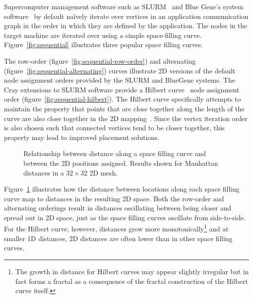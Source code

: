 				Supercomputer management software such as SLURM~\cite{yoo03} and Blue
				Gene's system software~\cite{gilge14} by default na\"ively iterate over
				vertices in an application communication graph in the order in which
				they are defined by the application. The nodes in the target machine
				are iterated over using a simple space-filling curve.
				Figure~\ref{fig:sequential} illustrates three popular space filling
				curves.
				
				The row-order (figure~\ref{fig:sequential-row-order}) and alternating
				(figure~\ref{fig:sequential-alternating}) curves illustrate 2D versions
				of the default node assignment orders provided by the SLURM and
				BlueGene systems.  The Cray extensions to SLURM software provide a
				Hilbert curve~\cite{hilbert91} node assignment order
				(figure~\ref{fig:sequential-hilbert}). The Hilbert curve specifically
				attempts to maintain the property that points that are close together
				along the length of the curve are also close together in the 2D
				mapping~\cite{moon01, zumbusch99}. Since the vertex iteration order is
				also chosen such that connected vertices tend to be closer together,
				this property may lead to improved placement solutions.
				
				\begin{figure}
					\center
					
					\caption[Relationship between space filling curve offset and 2D distance.]%
					{Relationship between distance along a space filling curve
					and between the 2D positions assigned. Results shown for
					Manhattan distances in a $32\times32$ 2D mesh.}
					\label{fig:space_filling_curves_comparison}
				\end{figure}
				
				Figure~\ref{fig:space_filling_curves_comparison} illustrates how the
				distance between locations along each space filling curve map to
				distances in the resulting 2D space. Both the row-order and alternating
				orderings result in distances oscillating between being closer and
				spread out in 2D space, just as the space filling curves oscillate from
				side-to-side. For the Hilbert curve, however, distances grow more
				monotonically\footnote{The growth in distance for Hilbert curves may
				appear slightly irregular but in fact forms a fractal as a consequence
				of the fractal construction of the Hilbert curve itself.} and at
				smaller 1D distances, 2D distances are often lower than in other space
				filling curves.
				
